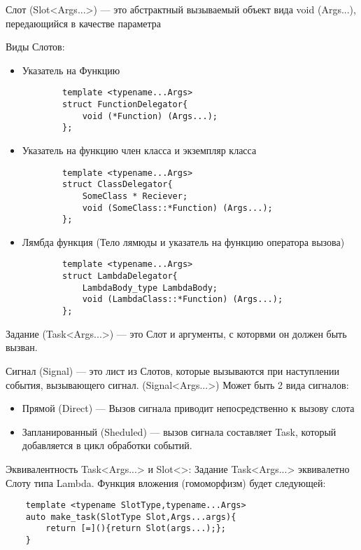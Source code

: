 Слот (Slot<Args...>) --- это абстрактный вызываемый объект вида void (Args...), передающийся в качестве параметра

Виды Слотов:
\begin{itemize}
	\item Указатель на Функцию
	\begin{lstlisting}
		template <typename...Args>
		struct FunctionDelegator{
			void (*Function) (Args...);
		};
	\end{lstlisting}
	\item Указатель на функцию член класса и экземпляр класса
	\begin{lstlisting}
		template <typename...Args>
		struct ClassDelegator{
			SomeClass * Reciever;
			void (SomeClass::*Function) (Args...);
		};
	\end{lstlisting}
	\item Лямбда функция (Тело лямюды и указатель на функцию оператора вызова)
	\begin{lstlisting}
		template <typename...Args>
		struct LambdaDelegator{
			LambdaBody_type LambdaBody;
			void (LambdaClass::*Function) (Args...);
		};
	\end{lstlisting}
\end{itemize}

Задание (Task<Args...>) --- это Слот и аргументы, с которвми он должен быть вызван.

Сигнал (Signal) --- это лист из Слотов, которые вызываются при наступлении события, вызывающего сигнал. (Signal<Args...>)
Может быть 2 вида сигналов: 
\begin{itemize}
	\item Прямой (Direct) --- Вызов сигнала приводит непосредственно к вызову слота 
	\item Запланированный (Sheduled) --- вызов сигнала составляет Task, который добавляется в цикл обработки событий.
\end{itemize}

Эквивалентность Task<Args...> и Slot<>: Задание Task<Args...> эквивалетно Слоту типа Lambda. Функция вложения (гомоморфизм) будет следующей:
\begin{lstlisting}
	template <typename SlotType,typename...Args>
	auto make_task(SlotType Slot,Args...args){
		return [=](){return Slot(args...);};
	}
\end{lstlisting}


